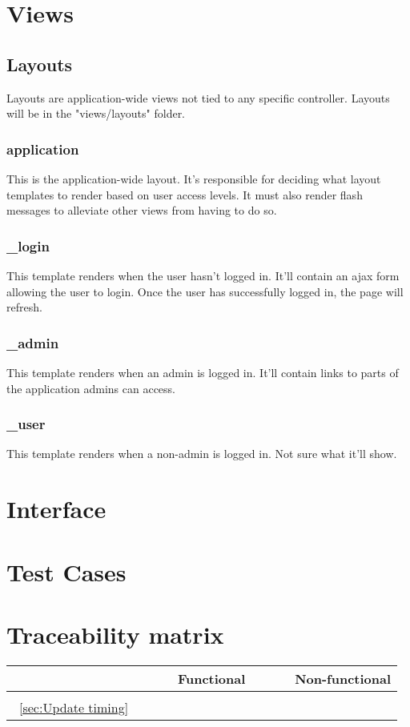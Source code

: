 \documentclass[12pt]{article}
\renewcommand{\c}{\checkmark}
\newcommand{\s}[1] {\begin{sideways}#1\end{sideways}}
\begin{document}
\section{Views}
\subsection{Layouts}
Layouts are application-wide views not tied to any specific controller. Layouts will be in the "views/layouts" folder.
\subsubsection{application}
This is the application-wide layout. It's responsible for deciding what layout templates to render based on user access levels.
It must also render flash messages to alleviate other views from having to do so.
\subsubsection{\_login}
This template renders when the user hasn't logged in. It'll contain an ajax form allowing the user to login.
Once the user has successfully logged in, the page will refresh.
\subsubsection{\_admin}
This template renders when an admin is logged in. It'll contain links to parts of the application admins can access.
\subsubsection{\_user}
This template renders when a non-admin is logged in. Not sure what it'll show.


\section{Interface}

\section{Test Cases}


\section{Traceability matrix}
\begin{center}
\begin{tabular}{|l||*{12}{c|}|*{4}{c|}}
\hline
\multicolumn{1}{|c||}{ }&
\multicolumn{12}{|c||}{Functional} &
\multicolumn{4}{|c|}{Non-functional}\\
\hline
	& \s{} & \\
\hline
\hline
~\ref{sec:Update timing}	&	\c \\
\hline
\end{tabular}
\end{center}
\end{document}
